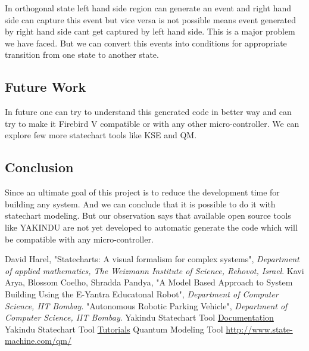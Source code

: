 \documentclass[a4paper,12pt,oneside]{article}
\begin{document}
In orthogonal state left hand side region can generate an event and right hand side can capture this event but vice versa is not possible means event generated by right hand side cant get captured by left hand side. This is a major problem we have faced. But we can convert this events into conditions for appropriate transition from one state to another state.\\


\subsection{Future Work}

In future one can try to understand this generated code in better way and can try to make it Firebird V compatible or with any other micro-controller. We can explore few more statechart tools like KSE and QM.

\subsection{Conclusion}

Since an ultimate goal of this project is to reduce the development time for building any system. And we can conclude that it is possible to do it with statechart modeling. But our observation says that available open source tools like YAKINDU are not yet developed to automatic generate the code which will be compatible with any micro-controller.\\


\begin{thebibliography}{5}
  David Harel, "Statecharts: A visual formalism for complex systems", \emph{Department of applied mathematics, The Weizmann Institute of Science, Rehovot, Israel}.
  Kavi Arya, Blossom Coelho, Shradda Pandya, "A Model Based Approach to System Building Using the E-Yantra Educatonal Robot", \emph{Department of Computer Science, IIT Bombay}.
  "Autonomous Robotic Parking Vehicle", \emph{Department of Computer Science, IIT Bombay}.
  Yakindu Statechart Tool \href{https://www.itemis.com/en/yakindu/statechart-tools/documentation/user-guide/}{Documentation}
  Yakindu Statechart Tool \href{https://www.itemis.com/en/yakindu/statechart-tools/documentation/tutorials/#oss_five-minutes-tutorial}{Tutorials}
  Quantum Modeling Tool \href{http://www.state-machine.com/qm/}{http://www.state-machine.com/qm/}
\end{thebibliography}
\end{document}
